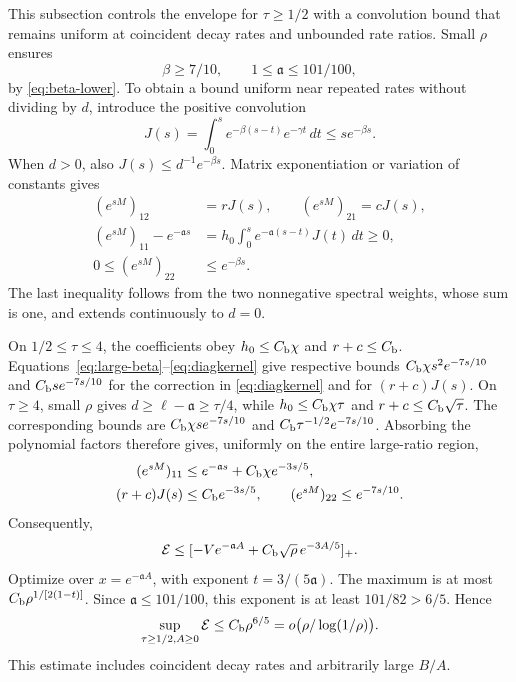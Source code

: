\documentclass[aps,pra,reprint,amsmath,amssymb,nofootinbib,floatfix,longbibliography]{revtex4-2}
\theoremstyle{aps}
\begin{document}
This subsection controls the envelope for $\tau\ge1/2$ with a convolution bound that remains uniform at coincident decay rates and unbounded rate ratios. Small $\rho$ ensures
\begin{equation}\label{eq:large-beta}
 \beta\ge7/10,\qquad 1\le\mathfrak a\le101/100,
\end{equation}
by \eqref{eq:beta-lower}. To obtain a bound uniform near repeated rates without dividing by $d$, introduce the positive convolution
\begin{equation}\label{eq:Jkernel}
 J(s)=\int_0^s e^{-\beta(s-t)}e^{-\gamma t}\,dt
 \le s e^{-\beta s}.
\end{equation}
When $d>0$, also $J(s)\le d^{-1}e^{-\beta s}$. Matrix exponentiation or variation of constants gives
\begin{align}
 (e^{sM})_{12}&=rJ(s),\qquad (e^{sM})_{21}=cJ(s),\label{eq:offdiag}\\
 (e^{sM})_{11}-e^{-\mathfrak a s}
 &=h_0\int_0^s e^{-\mathfrak a(s-t)}J(t)\,dt\ge0,\label{eq:diagkernel}\\
 0\le(e^{sM})_{22}&\le e^{-\beta s}.\label{eq:diag22}
\end{align}
The last inequality follows from the two nonnegative spectral weights, whose sum is one, and extends continuously to $d=0$.

On $1/2\le\tau\le4$, the coefficients obey $h_0\le C_{\rm b}\chi$ and $r+c\le C_{\rm b}$. Equations~\eqref{eq:large-beta}--\eqref{eq:diagkernel} give respective bounds $C_{\rm b}\chi s^2e^{-7s/10}$ and $C_{\rm b}se^{-7s/10}$ for the correction in \eqref{eq:diagkernel} and for $(r+c)J(s)$. On $\tau\ge4$, small $\rho$ gives
$d\ge\ell-\mathfrak a\ge\tau/4$, while $h_0\le C_{\rm b}\chi\tau$ and $r+c\le C_{\rm b}\sqrt\tau$. The corresponding bounds are $C_{\rm b}\chi s e^{-7s/10}$ and $C_{\rm b}\tau^{-1/2}e^{-7s/10}$. Absorbing the polynomial factors therefore gives, uniformly on the entire large-ratio region,
\begin{equation}\label{eq:large-elements}
 \begin{split}
 (e^{sM})_{11}&\le e^{-\mathfrak a s}+C_{\rm b}\chi e^{-3s/5},\\
 (r+c)J(s)&\le C_{\rm b}e^{-3s/5},\qquad
 (e^{sM})_{22}\le e^{-7s/10}.
 \end{split}
\end{equation}
Consequently,
\begin{equation}\label{eq:large-envelope}
 \mathcal E\le[-Ve^{-\mathfrak a A}+C_{\rm b}\sqrt\rho\,e^{-3A/5}]_+.
\end{equation}
Optimize over $x=e^{-\mathfrak a A}$, with exponent $t=3/(5\mathfrak a)$. The maximum is at most $C_{\rm b}\rho^{1/[2(1-t)]}$. Since $\mathfrak a\le101/100$, this exponent is at least $101/82>6/5$. Hence
\begin{equation}\label{eq:large-final}
 \sup_{\tau\ge1/2,A\ge0}\mathcal E\le C_{\rm b}\rho^{6/5}
 =o\bigl(\rho/\log(1/\rho)\bigr).
\end{equation}
This estimate includes coincident decay rates and arbitrarily large $B/A$.
\end{document}

